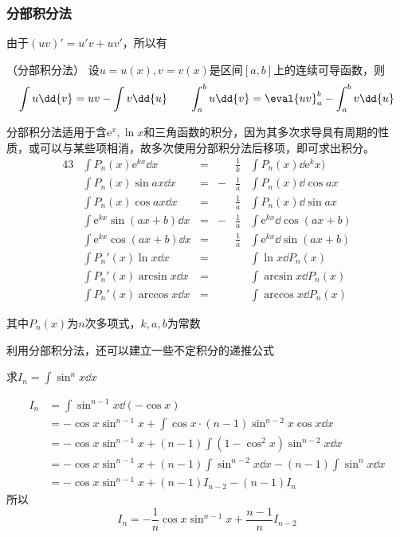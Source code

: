\subsubsection{分部积分法}
由于$(uv)'=u'v+uv'$，所以有
\begin{theorem}
    （分部积分法）
    设$u=u(x),v=v(x)$是区间$[a,b]$上的连续可导函数，则
    \[ \int u\dd{v} = uv - \int v\dd{u} \qquad \int_a^b u\dd{v} = \eval{uv}_a^b - \int_a^bv\dd{u} \]
\end{theorem}
\begin{situation}
    分部积分法适用于含$\mathrm{e}^x,\ln x$和三角函数的积分，因为其多次求导具有周期的性质，或可以与某些项相消，故多次使用分部积分法后移项，即可求出积分。
    \begin{alignat*}{43}
         & \int P_n(x)\mathrm{e}^{kx}\dd{x}     & = &   & \frac{1}{k} & \int P_n(x)\dd{\mathrm{e}^kx)}      \\
         & \int P_n(x)\sin ax\dd{x}             & = & - & \frac{1}{a} & \int P_n(x)\dd{\cos ax}             \\
         & \int P_n(x)\cos ax\dd{x}             & = &   & \frac{1}{a} & \int P_n(x)\dd{\sin ax}             \\
         & \int \mathrm{e}^{kx}\sin(ax+b)\dd{x} & = & - & \frac{1}{a} & \int \mathrm{e}^{kx}\dd{\cos(ax+b)} \\
         & \int \mathrm{e}^{kx}\cos(ax+b)\dd{x} & = &   & \frac{1}{a} & \int \mathrm{e}^{kx}\dd{\sin(ax+b)} \\
         & \int P_n'(x)\ln x\dd{x}              & = &   &             & \int \ln x\dd{P_n(x)}               \\
         & \int P_n'(x)\arcsin x\dd{x}          & = &   &             & \int \arcsin x\dd{P_n(x)}           \\
         & \int P_n'(x)\arccos x\dd{x}          & = &   &             & \int \arccos x\dd{P_n(x)}
    \end{alignat*}

    其中$P_n(x)$为$n$次多项式，$k,a,b$为常数
\end{situation}
利用分部积分法，还可以建立一些不定积分的递推公式
\begin{example}
    求$I_n=\int \sin^n x\dd{x}$
\end{example}
\begin{solution}
    \begin{align*}
        I_n & = \int \sin^{n-1} x \dd(-\cos x)                                            \\
            & = -\cos x\sin^{n-1}x + \int \cos x\cdot(n-1)\sin^{n-2}x\cos x\dd{x}         \\
            & = -\cos x\sin^{n-1}x + (n-1)\int (1-\cos^2 x)\sin^{n-2}x\dd{x}              \\
            & = -\cos x\sin^{n-1}x + (n-1)\int \sin^{n-2}x\dd{x} - (n-1)\int\sin^nx\dd{x} \\
            & = -\cos x\sin^{n-1}x + (n-1)I_{n-2} - (n-1)I_n
    \end{align*}
    所以
    \[ I_n = -\frac{1}{n}\cos x\sin^{n-1}x + \frac{n-1}{n}I_{n-2} \]
\end{solution}

